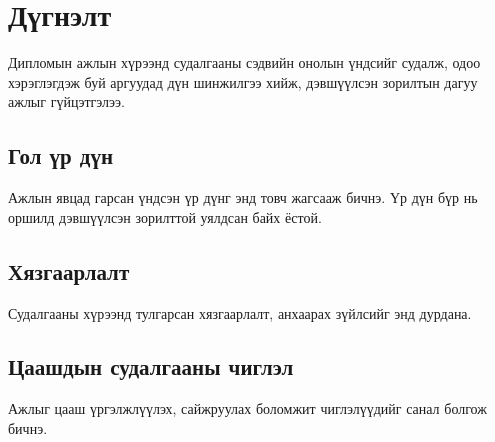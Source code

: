\chapter{Дүгнэлт}

Дипломын ажлын хүрээнд судалгааны сэдвийн онолын үндсийг судалж, одоо хэрэглэгдэж буй аргуудад дүн шинжилгээ хийж, дэвшүүлсэн зорилтын дагуу ажлыг гүйцэтгэлээ.

\section{Гол үр дүн}

Ажлын явцад гарсан үндсэн үр дүнг энд товч жагсааж бичнэ. Үр дүн бүр нь оршилд дэвшүүлсэн зорилттой уялдсан байх ёстой.

\section{Хязгаарлалт}

Судалгааны хүрээнд тулгарсан хязгаарлалт, анхаарах зүйлсийг энд дурдана.

\section{Цаашдын судалгааны чиглэл}

Ажлыг цааш үргэлжлүүлэх, сайжруулах боломжит чиглэлүүдийг санал болгож бичнэ.
